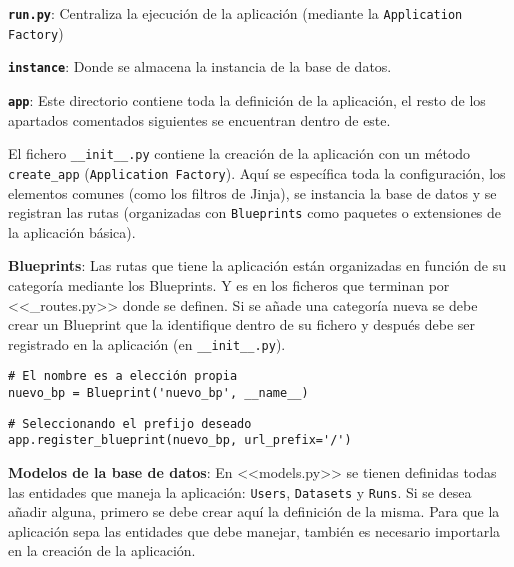 \textbf{\texttt{run.py}}: Centraliza la ejecución de la aplicación (mediante la
\texttt{Application Factory}) 

\textbf{\texttt{instance}}: Donde se almacena la instancia de la base de datos.

\textbf{\texttt{app}}: Este directorio contiene toda la definición de la
aplicación, el resto de los apartados comentados siguientes se encuentran dentro
de este.

El fichero \texttt{\_\_init\_\_.py} contiene la creación de la aplicación con un
método \texttt{create\_app} (\texttt{Application Factory}). Aquí se específica
toda la configuración, los elementos comunes (como los filtros de Jinja), se
instancia la base de datos y se registran las rutas (organizadas con
\texttt{Blueprints} como paquetes o extensiones de la aplicación básica).

\textbf{Blueprints}: Las rutas que tiene la aplicación están organizadas en
función de su categoría mediante los Blueprints. Y es en los ficheros que
terminan por <<\_routes.py>> donde se definen. Si se añade una categoría nueva
se debe crear un Blueprint que la identifique dentro de su fichero y después
debe ser registrado en la aplicación (en \texttt{\_\_init\_\_.py}).

\begin{tcolorbox}[colback=cyan!5!white,colframe=cyan!75!black,title=Crear Blueprint]
\begin{verbatim}
# El nombre es a elección propia
nuevo_bp = Blueprint('nuevo_bp', __name__)
\end{verbatim}
\end{tcolorbox}

\begin{tcolorbox}[colback=cyan!5!white,colframe=cyan!75!black,title=Registrar Blueprint en la aplicación (en \texttt{\_\_init\_\_.py})] 
\begin{verbatim}
# Seleccionando el prefijo deseado
app.register_blueprint(nuevo_bp, url_prefix='/') 
\end{verbatim}
\end{tcolorbox}

\textbf{Modelos de la base de datos}: En <<models.py>> se tienen definidas todas
las entidades que maneja la aplicación: \texttt{Users}, \texttt{Datasets} y
\texttt{Runs}. Si se desea añadir alguna, primero se debe crear aquí la
definición de la misma. Para que la aplicación sepa las entidades que debe
manejar, también es necesario importarla en la creación de la aplicación.


